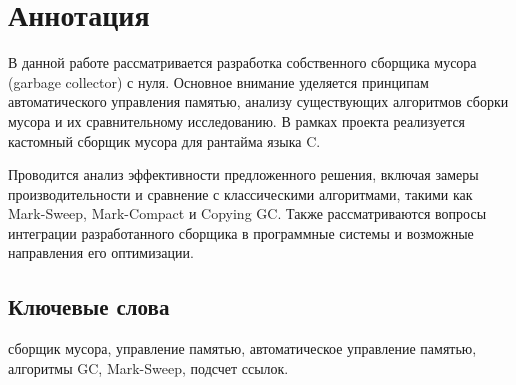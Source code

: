 \section*{Аннотация}
В данной работе рассматривается разработка собственного сборщика мусора (garbage collector) с нуля. Основное внимание уделяется принципам автоматического управления памятью, анализу существующих алгоритмов сборки мусора и их сравнительному исследованию. В рамках проекта реализуется кастомный сборщик мусора для рантайма языка C.

Проводится анализ эффективности предложенного решения, включая замеры производительности и сравнение с классическими алгоритмами, такими как Mark-Sweep, Mark-Compact и Copying GC. Также рассматриваются вопросы интеграции разработанного сборщика в программные системы и возможные направления его оптимизации.


\subsection*{Ключевые слова}
сборщик мусора, управление памятью, автоматическое управление памятью, алгоритмы GC, Mark-Sweep, подсчет ссылок.